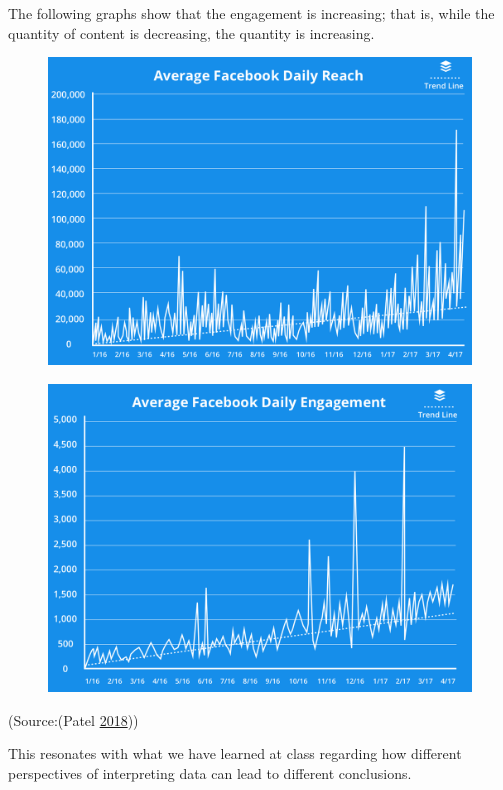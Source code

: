 \documentclass[]{book}
\theoremstyle{definition}
\theoremstyle{definition}
\theoremstyle{definition}
\theoremstyle{remark}
\begin{document}
The following graphs show that the engagement is increasing; that is,
while the quantity of content is decreasing, the quantity is increasing.

\begin{figure}
\centering
\includegraphics{images/average-facebook-reach.png}
\caption{}
\end{figure}

\begin{figure}
\centering
\includegraphics{images/average-facebook-daily-reach.png}
\caption{}
\end{figure}

(Source:(Patel \protect\hyperlink{ref-facebook_organic}{2018}))

This resonates with what we have learned at class regarding how
different perspectives of interpreting data can lead to different
conclusions.
\end{document}

